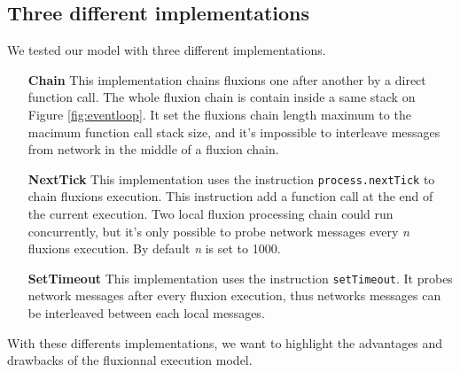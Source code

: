 \subsection{Three different implementations}

We tested our model with three different implementations.

\begin{itemize}
	\item[\textbf{Chain}]
		This implementation chains fluxions one after another by a direct function call.
		The whole fluxion chain is contain inside a same stack on Figure \ref{fig:eventloop}.
		It set the fluxions chain length maximum to the macimum function call stack size, and it's impossible to interleave messages from network in the middle of a fluxion chain.

	\item[\textbf{NextTick}]
		This implementation uses the instruction \texttt{process.nextTick} to chain fluxions execution.
		This instruction add a function call at the end of the current execution.
		Two local fluxion processing chain could run concurrently, but it's only possible to probe network messages every \textit{n} fluxions execution.
		By default \textit{n} is set to 1000.

	\item[\textbf{SetTimeout}]
		This implementation uses the instruction \texttt{setTimeout}.
		It probes network messages after every fluxion execution, thus networks messages can be interleaved between each local messages.
\end{itemize}

With these differents implementations, we want to highlight the advantages and drawbacks of the fluxionnal execution model.

% 

% 

% 

